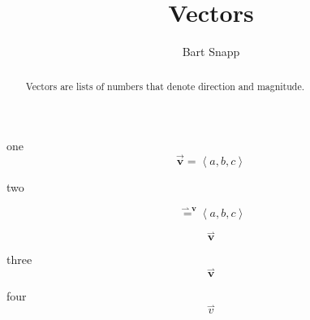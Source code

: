 \documentclass{ximera}
\author{Bart Snapp}
\title[Dig-In:]{Vectors}
\begin{document}
\begin{abstract}
  Vectors are lists of numbers that denote direction and magnitude.
\end{abstract}
\maketitle




one
\[ \mathbf{\vec{v}} = \left\langle a,b,c \right\rangle   \]





two

\[ \overset{\rightharpoonup{\mathbf{v}}} = \left\langle a,b,c \right\rangle   \]



\[ {{\overset{\boldsymbol{\rightharpoonup}}{\mathbf{v}}}}  \]

three
\[ {\overset{\boldsymbol{\rightharpoonup}}{\mathbf{v}}}  \]

four
\[ {{\overset{\boldsymbol{\rightharpoonup}}{v}}} \]
\end{document}
